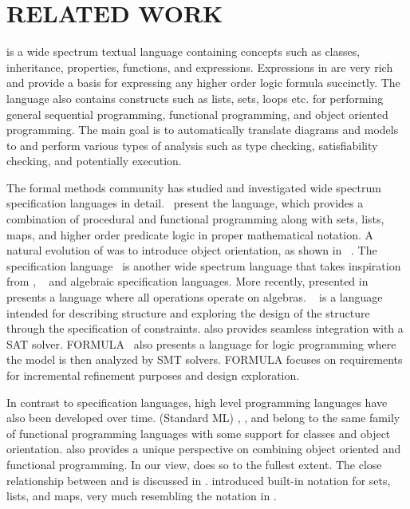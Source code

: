 \section{RELATED WORK}
\label{sec:related-work}

\Klang{} is a wide spectrum textual language containing concepts such
as classes, inheritance, properties, functions, and
expressions. Expressions in \Klang{} are very rich and provide a basis
for expressing any higher order logic formula succinctly. The language
also contains constructs such as lists, sets, loops etc. for
performing general sequential programming, functional programming, and
object oriented programming. The main goal is to automatically
translate \sysml{} diagrams and models to \Klang{} and perform various
types of analysis such as type checking, satisfiability checking, and
potentially execution.

The formal methods community has studied and investigated wide
spectrum specification languages in
detail.~\cite{vdm78,bjoerner-jones-82,jones90,jones-shaw-90} present
the \vdm{} language, which provides a combination of procedural and
functional programming along with sets, lists, maps, and higher order
predicate logic in proper mathematical notation. A natural evolution
of \vdm{} was to introduce object orientation, as shown in
\vdmpp{}~\cite{vdmplusplus05}. The \raiselang{} specification
language~\cite{raise92} is another wide spectrum language that takes
inspiration from \vdm{}, \zlang{}~\cite{spivey-Z-1988} and algebraic
specification languages. More recently, \asml{} presented
in~\cite{asml05} presents a language where all operations operate on
algebras. \alloy{}~\cite{jackson-alloy-12} is a language intended for
describing structure and exploring the design of the structure through
the specification of constraints. \alloy{} also provides seamless
integration with a SAT solver. FORMULA~\cite{jackson2009specifying}
also presents a language for logic programming where the model is then
analyzed by SMT solvers. FORMULA focuses on requirements for
incremental refinement purposes and design exploration.

In contrast to specification languages, high level programming
languages have also been developed over time. \sml{} (Standard ML)
\cite{standard-ml-97}, \ocaml{} \cite{ocaml}, and \haskell{}
\cite{jones2003haskell} belong to the same family of functional
programming languages with some support for classes and object
orientation. \python{} \cite{python} also provides a unique
perspective on combining object oriented and functional
programming. In our view, \scala{} \cite{scala} does so to the fullest
extent. The close relationship between \scala{} and \vdm{} is
discussed in \cite{havelund-scala-vdm-12}.  \fortress{}
\cite{fortress} introduced built-in notation for sets, lists, and
maps, very much resembling the notation in \vdm{}.

